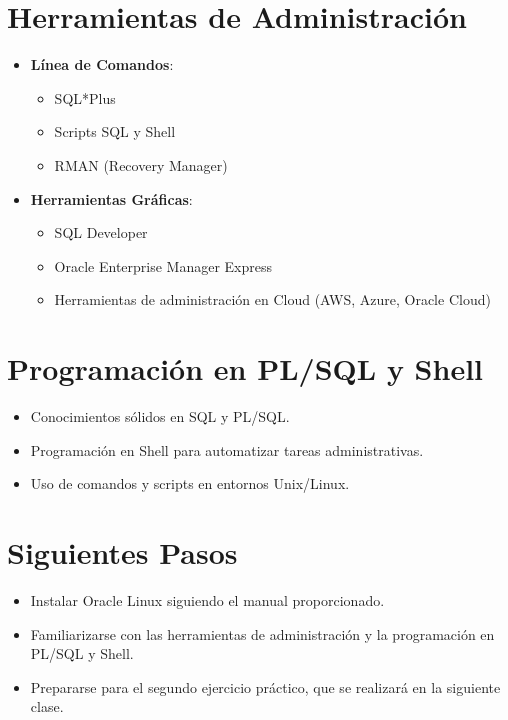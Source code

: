 \documentclass{article}
\begin{document}
\section{Herramientas de Administración}
\begin{itemize}
    \item \textbf{Línea de Comandos}:
    \begin{itemize}
        \item SQL*Plus
        \item Scripts SQL y Shell
        \item RMAN (Recovery Manager)
    \end{itemize}
    \item \textbf{Herramientas Gráficas}:
    \begin{itemize}
        \item SQL Developer
        \item Oracle Enterprise Manager Express
        \item Herramientas de administración en Cloud (AWS, Azure, Oracle Cloud)
    \end{itemize}
\end{itemize}

\section{Programación en PL/SQL y Shell}
\begin{itemize}
    \item Conocimientos sólidos en SQL y PL/SQL.
    \item Programación en Shell para automatizar tareas administrativas.
    \item Uso de comandos y scripts en entornos Unix/Linux.
\end{itemize}

\section{Siguientes Pasos}
\begin{itemize}
    \item Instalar Oracle Linux siguiendo el manual proporcionado.
    \item Familiarizarse con las herramientas de administración y la programación en PL/SQL y Shell.
    \item Prepararse para el segundo ejercicio práctico, que se realizará en la siguiente clase.
\end{itemize}
\end{document}
